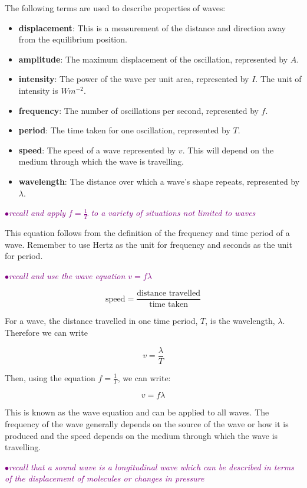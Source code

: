 \documentclass[a4paper,11pt,twoside]{memoir}
\newcounter{spec}[chapter]
\newcommand{\spec}[1]{\Needspace{5\baselineskip}\textcolor{purple}{$\bullet$\hspace{0.5cm}\textit{#1}}}
\begin{document}
The following terms are used to describe properties of waves:
\begin{itemize}
\item \textbf{displacement}: This is a measurement of the distance and direction away from the equilibrium position.
\item \textbf{amplitude}: The maximum displacement of the oscillation, represented by $A$.
\item \textbf{intensity}: The power of the wave per unit area, represented by $I$. The unit of intensity is $Wm^{-2}$.
\item \textbf{frequency}: The number of oscillations per second, represented by $f$.
\item \textbf{period}: The time taken for one oscillation, represented by $T$.
\item \textbf{speed}: The speed of a wave represented by $v$. This will depend on the medium through which the wave is travelling.
\item \textbf{wavelength}: The distance over which a wave's shape repeats, represented by $\lambda$.

\end{itemize}

\spec{recall and apply $f = \frac{1}{T}$ to a variety of situations not limited to waves}

This equation follows from the definition of the frequency and time period of a wave. Remember to use Hertz as the unit for frequency and seconds as the unit for period.

\spec{recall and use the wave equation $v=f\lambda$}

$$\text{speed} = \frac{\text{distance travelled}}{\text{time taken}}$$

For a wave, the distance travelled in one time period, $T$, is the wavelength, $\lambda$. Therefore we can write

\[v = \frac{\lambda}{T}\]

Then, using the equation $f=\frac{1}{T}$, we can write:

$$v = f\lambda$$

This is known as the wave equation and can be applied to all waves. The frequency of the wave generally depends on the source of the wave or how it is produced and the speed depends on the medium through which the wave is travelling.

\spec{recall that a sound wave is a longitudinal wave which can be described in terms of the displacement of molecules or changes in pressure}
\end{document}
